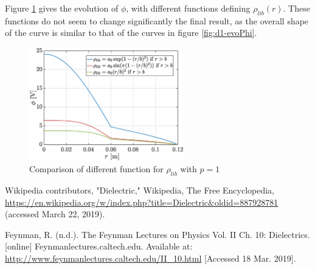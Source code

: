 \documentclass[a4paper,12pt,twoside]{article}
\begin{document}
      Figure \ref{fig:facrho} gives the evolution of $\phi$, with different functions defining $\rho_{lib}(r)$.
      These functions do not seem to change significantly the final result, as the overall shape of the curve is similar to that of the curves in figure \ref{fig:d1-evoPhi}.

      \begin{figure}[h]
        \centering
        \includegraphics[width=0.6\textwidth]{graphs/facrho.eps}
        \caption{Comparison of different function for $\rho_{lib}$ with $p=1$}
        \label{fig:facrho}
      \end{figure}

  \newpage
  \begin{thebibliography}{99}
     Wikipedia contributors, "Dielectric," Wikipedia, The Free Encyclopedia, \url{https://en.wikipedia.org/w/index.php?title=Dielectric&oldid=887928781} (accessed March 22, 2019).

     Feynman, R. (n.d.). The Feynman Lectures on Physics Vol. II Ch. 10: Dielectrics. [online] Feynmanlectures.caltech.edu. Available at: \url{http://www.feynmanlectures.caltech.edu/II_10.html} [Accessed 18 Mar. 2019].
  \end{thebibliography}
\end{document}
